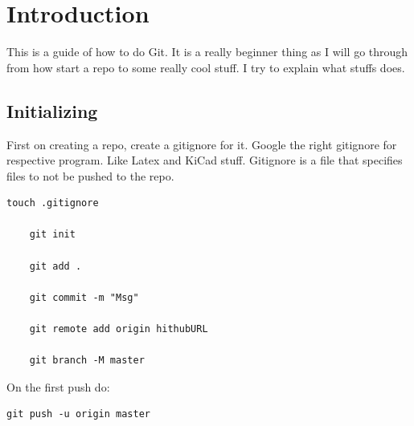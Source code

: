\documentclass[12pt]{report} %
\begin{document}
\listoffigures
\newpage

\listoftables
{}
\newpage

\setcounter{page}{1}


\chapter{Introduction}
This is a guide of how to do Git. It is a really beginner thing as I will go through from how start a repo to some really cool stuff. I try to explain what stuffs does. 

\section{Initializing}

First on creating a repo, create a gitignore for it. Google the right gitignore for respective program. Like Latex and KiCad stuff. Gitignore is a file that specifies files to not be pushed to the repo. 


\begin{lstlisting}[caption={Commands for init first repo},captionpos=b,label=lst:firstRepo]
	touch .gitignore

	git init 
	
	git add .
	
	git commit -m "Msg"
	
	git remote add origin hithubURL
	
	git branch -M master
\end{lstlisting}

On the first push do:
\begin{lstlisting}[caption={First Push},captionpos=b,label=lst:firstPush]
	git push -u origin master
\end{lstlisting}
\end{document}
